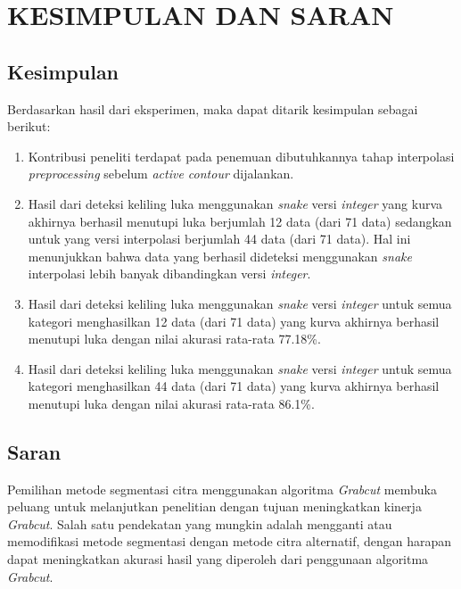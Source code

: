 
\chapter{KESIMPULAN DAN SARAN}

\section{Kesimpulan}
Berdasarkan hasil dari eksperimen, maka dapat ditarik kesimpulan sebagai berikut:
\begin{enumerate}
	\item Kontribusi peneliti terdapat pada penemuan dibutuhkannya tahap interpolasi \emph{preprocessing} sebelum \emph{active contour} dijalankan.
	\item Hasil dari deteksi keliling luka menggunakan \emph{snake} versi \emph{integer} yang kurva akhirnya berhasil menutupi luka berjumlah 12 data (dari 71 data) sedangkan untuk yang versi interpolasi berjumlah 44 data (dari 71 data). Hal ini menunjukkan bahwa data yang berhasil dideteksi menggunakan \emph{snake} interpolasi lebih banyak dibandingkan versi \emph{integer}.
	\item Hasil dari deteksi keliling luka menggunakan \emph{snake} versi \emph{integer} untuk semua kategori menghasilkan 12 data (dari 71 data) yang kurva akhirnya berhasil menutupi luka dengan nilai akurasi rata-rata 77.18\%.
	\item Hasil dari deteksi keliling luka menggunakan \emph{snake} versi \emph{integer} untuk semua kategori menghasilkan 44 data (dari 71 data) yang kurva akhirnya berhasil menutupi luka dengan nilai akurasi rata-rata 86.1\%.
\end{enumerate}

\section{Saran}
Pemilihan metode segmentasi citra menggunakan algoritma \emph{Grabcut} membuka peluang 
untuk melanjutkan penelitian dengan tujuan meningkatkan kinerja \emph{Grabcut}. 
Salah satu pendekatan yang mungkin adalah mengganti atau memodifikasi metode 
segmentasi dengan metode citra alternatif, dengan harapan dapat meningkatkan 
akurasi hasil yang diperoleh dari penggunaan algoritma \emph{Grabcut}.

\begin{comment}

\end{comment}